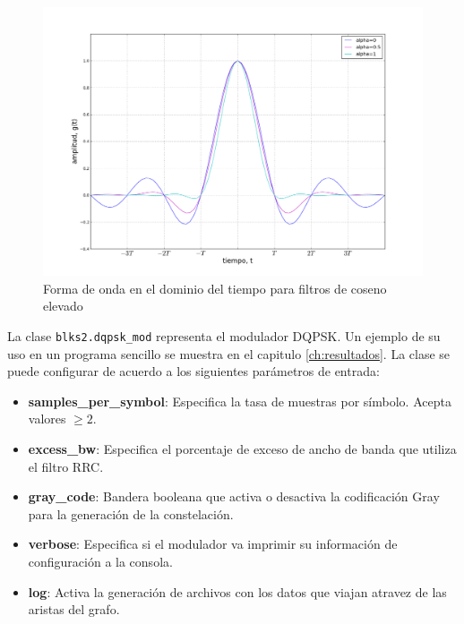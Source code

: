 \begin{figure}[htp]
  \centering
  \includegraphics[width=5.9in]{figs/rrctime}
  \vspace{0.3in}
  \caption{Forma de onda en el dominio del tiempo para filtros de coseno elevado}
  \label{fig:rrctime}
\end{figure}

La clase \verb|blks2.dqpsk_mod| representa el modulador DQPSK. Un ejemplo de su uso en un programa sencillo se muestra en el
capitulo \ref{ch:resultados}. La clase se puede configurar de acuerdo a los siguientes par\'ametros de entrada:

\begin{itemize}
  \item \textbf{samples\_per\_symbol}: Especifica la tasa de muestras por s\'imbolo. Acepta valores $\geq 2$.
  \item \textbf{excess\_bw}: Especifica el porcentaje de exceso de ancho de banda que utiliza el filtro RRC.
  \item \textbf{gray\_code}: Bandera booleana que activa o desactiva la codificaci\'on Gray para la generaci\'on de la
  constelaci\'on.
  \item \textbf{verbose}: Especifica si el modulador va imprimir su informaci\'on de configuraci\'on a la consola.
  \item \textbf{log}: Activa la generaci\'on de archivos con los datos que viajan atravez de las aristas del grafo.
\end{itemize} 



